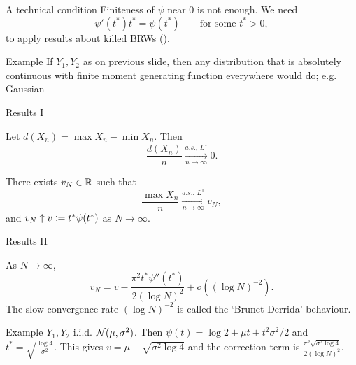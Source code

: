 \documentclass{beamer}
\begin{document}
\begin{frame}{A technical condition}
Finiteness of $\psi$ near $0$ is not enough. We need
\begin{equation}\nonumber
\psi'(t^*) t^* = \psi(t^*) \qquad\text{for some } t^* > 0, 
\end{equation}
to apply results about killed BRWs (\cite{gantert2008asymptotics}). 

\begin{block}{Example}
If $Y_1, Y_2$ as on previous slide, then any distribution that is absolutely continuous with finite moment generating function everywhere would do; e.g. Gaussian
\end{block}
\end{frame}







\begin{frame}{Results I}
\begin{proposition}
Let $d(X_n) = \max X_n - \min X_n$. Then 
\begin{equation}\nonumber
\frac{d(X_n)}{n} \xrightarrow[n \to \infty]{a.s.,\, L^1} 0. 
\end{equation}
\end{proposition}

\begin{proposition}
There exists $v_N \in \R$ such that
\begin{equation}\nonumber
\frac{\max X_n}{n} \xrightarrow[n \to \infty]{a.s.,\, L^1} v_N, 
\end{equation}
and $v_N \uparrow v \defeq t^* \psi(t^*)$ as $N \to \infty$.  
\end{proposition}
\end{frame}






\begin{frame}{Results II}
\begin{theorem}
As $N \to \infty$, 
\begin{equation}\nonumber
v_N = v - \frac{\pi^2 t^* \psi''(t^*)} {2 (\log N)^2} + o((\log N)^{-2}). 
\end{equation}
The slow convergence rate $(\log N)^{-2}$ is called the `Brunet-Derrida' behaviour. 
\end{theorem}

\begin{block}{Example}
$Y_1, Y_2$ i.i.d. $\cal{N}(\mu, \sigma^2)$. Then $\psi(t) = \log 2 + \mu t + t^2 \sigma^2 / 2$ and $t^* = \sqrt{\frac{\log 4}{\sigma^2}}$. This gives $v = \mu + \sqrt{\sigma^2 \log 4}$ and the correction term is $\frac{\pi^2 \sqrt{\sigma^2 \log 4}}{2 (\log N)^2}$. 
\end{block}
\end{frame}
\end{document}
